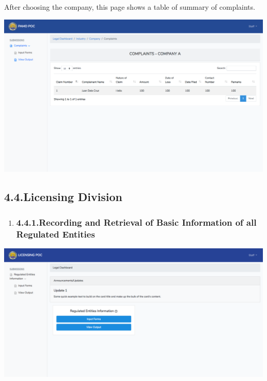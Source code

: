 \documentclass{article}
\begin{document}
After choosing the company, this page shows a table of
summary of complaints.%

\includegraphics[keepaspectratio=true]{up-ic-screens/image9}{}%

\mdhr{}%

\subsection{4.4.\hspace*{0.5em}Licensing Division}\label{sec-licensing-division}%

\begin{enumerate}[noitemsep,topsep=\mdcompacttopsep]%

\item{}
\subsubsection{4.4.1.\hspace*{0.5em}Recording and Retrieval of Basic Information of all Regulated Entities}\label{sec-recording-and-retrieval-of-basic-information-of-all-regulated-entities}%
\end{enumerate}%

\noindent{}\includegraphics[keepaspectratio=true]{up-ic-screens/image144}{}%
\end{document}
